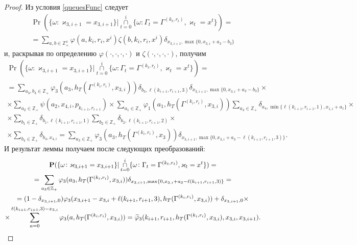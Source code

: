\documentclass[a4paper,12pt,russian]{extarticle}
\begin{document}
\begin{proof}
Из условия \eqref{queuesFunc} следует
\begin{multline*}
\Pr (\{ \omega \colon \varkappa_{3,i+1} = x_{3,i+1}\} |\mathop{\cap}\limits_{t=0}^{i}\{\omega\colon \Gamma_t=\Gamma^{(k_t,r_t)}, \varkappa_t=x^t\})=\\
= \sum_{a,b\in \mathbb{Z}_+^4} \varphi(a,k_i,r_i,x^i)\zeta(b,k_i,r_i,x^i)  \delta_{x_{3,i+1},\max\{0,x_{3,i}+a_3-b_3\}} 
\end{multline*}
и, раскрывая по определению $\varphi(\cdot, \cdot, \cdot, \cdot)$ и $\zeta(\cdot, \cdot, \cdot, \cdot)$, получим
\begin{multline*}
\Pr (\{ \omega \colon \varkappa_{3,i+1} = x_{3,i+1}\} |\mathop{\cap}\limits_{t=0}^{i}\{\omega\colon \Gamma_t=\Gamma^{(k_t,r_t)}, \varkappa_t=x^t\})=\\= \sum_{a_3,b_3\in \mathbb{Z}_+} \varphi_3(a_3,h_T(\Gamma^{(k_i,r_i)},x_{3,i})) \delta_{b_3,\ell(k_{i+1},r_{i+1},3)} \delta_{x_{3,i+1},\max\{0,x_{3,i}+a_3-b_3\}} \times \\
\times
\sum_{a_2\in \mathbb{Z}_+} \psi(a_2,x_{4,i}, p_{k_{i+1},r_{i+1}}) 
\times \sum_{a_1\in \mathbb{Z}_+}  \varphi_1(a_1,h_T(\Gamma^{(k_i,r_i)},x_{3,i})) \sum_{a_4\in \mathbb{Z}_+} \delta_{a_4,\min{\{\ell(k_{i+1},r_{i+1},1), x_{1,i}+a_1}\}} \times \\ \times  \sum_{b_1\in \mathbb{Z}_+}  \delta_{b_1,\ell(k_{i+1},r_{i+1},1)} 
\sum_{b_2\in \mathbb{Z}_+}  \delta_{b_2,\ell(k_{i+1},r_{i+1},2)} \times \\
\times  \sum_{b_4\in \mathbb{Z}_+}\delta_{b_4,x_{4,i}} =  \sum_{a_3\in \mathbb{Z}_+} \varphi_3(a_3,h_T(\Gamma^{(k_i,r_i)},x_3))  \delta_{x_{3,i+1},\max\{0,x_{3,i}+a_3-\ell(k_{i+1},r_{i+1},3)\}}.
\end{multline*}
И результат леммы получаем после следующих преобразований:
\begin{multline*}
\Pr (\{ \omega \colon \varkappa_{3,i+1} = x_{3,i+1}\} |\mathop{\cap}\limits_{t=0}^{i}\{\omega\colon \Gamma_t=\Gamma^{(k_t,r_t)}, \varkappa_t=x^t\})=\\
=\sum_{a_3\in \mathbb{Z}_+} \varphi_3(a_3,h_T(\Gamma^{(k_i,r_i)},x_{3,i}))  \delta_{x_{3,i+1},\max\{0,x_{3,i}+a_3-\ell(k_{i+1},r_{i+1},3)\}}  = \\
=(1 - \delta_{x_{3,i+1},0})\varphi_3(x_{3,i+1}-x_{3,i} + \ell(k_{i+1},r_{i+1},3),h_T(\Gamma^{(k_i,r_i)},x_{3,i})) 
+\delta_{x_{3,i+1},0}\times\\\times\sum_{a=0}^{\ell(k_{i+1},r_{i+1},3)-x_{3,i}} \varphi_3(a,h_T(\Gamma^{(k_i,r_i)},x_{3,i})) 
=\widetilde{\varphi}_3(k_{i+1},r_{i+1},h_T(\Gamma^{(k_i,r_i)},x_{3,i}),x_{3,i},x_{3,i+1}).\qedhere
\end{multline*}
\end{proof}
\end{document}
